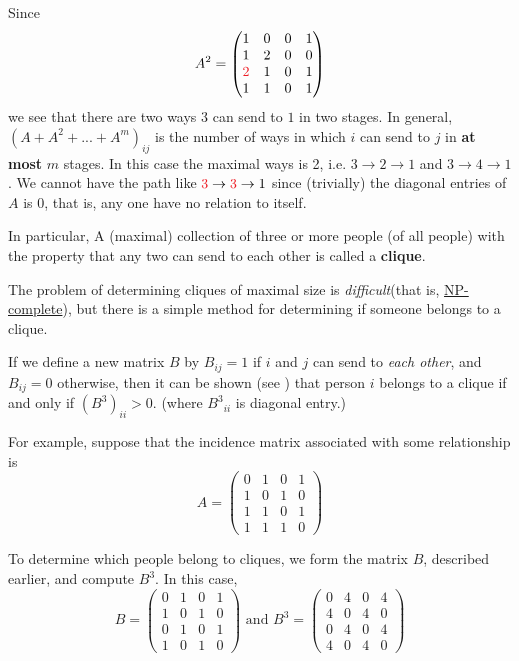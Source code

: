 Since
\[
    A^2 = \begin{pmatrix}
        1 & 0 & 0 & 1 \\
        1 & 2 & 0 & 0 \\
        \RED{2} & 1 & 0 & 1 \\
        1 & 1 & 0 & 1
    \end{pmatrix}
\]
we see that there are two ways \(3\) can send to \(1\) in two stages.
In general, \((A + A^2 + ... + A^m)_{ij}\) is the number of ways in which \(i\) can send to \(j\) in \textbf{at most} \(m\) stages.
In this case the maximal ways is 2, i.e. \(3 \to 2 \to 1\) and \(3 \to 4 \to 1\).
We cannot have the path like \(\RED{3} \to \RED{3} \to 1\) since (trivially) the diagonal entries of \(A\) is \(0\), that is, any one have no relation to itself.

In particular, A (maximal) collection of three or more people (of all people) with the property that any two can send to each other is called a \textbf{clique}.

The problem of determining cliques of maximal size is \emph{difficult}(that is, \href{https://www.wikiwand.com/en/NP-completeness}{NP-complete}), but there is a simple method for determining if someone belongs to a clique.

If we define a new matrix \(B\) by \(B_{ij} = 1\) if \(i\) and \(j\) can send to \textit{each other}, and \(B_{ij} = 0\) otherwise,
then it can be shown (see ) that person \(i\) belongs to a clique if and only if \((B^3)_{ii} > 0\). (where \({B^3}_{ii}\) is diagonal entry.)

For example, suppose that the incidence matrix associated with some relationship is
\[
    A = \begin{pmatrix}
        0 & 1 & 0 & 1 \\
        1 & 0 & 1 & 0 \\
        1 & 1 & 0 & 1 \\
        1 & 1 & 1 & 0
    \end{pmatrix}
\]

To determine which people belong to cliques, we form the matrix \(B\), described earlier, and compute \(B^3\).
In this case,
\[
    B = \begin{pmatrix}
        0 & 1 & 0 & 1 \\
        1 & 0 & 1 & 0 \\
        0 & 1 & 0 & 1 \\
        1 & 0 & 1 & 0
    \end{pmatrix}
    \text{ and }
    B^3 = \begin{pmatrix}
        0 & 4 & 0 & 4 \\
        4 & 0 & 4 & 0 \\
        0 & 4 & 0 & 4 \\
        4 & 0 & 4 & 0
    \end{pmatrix}
\]

